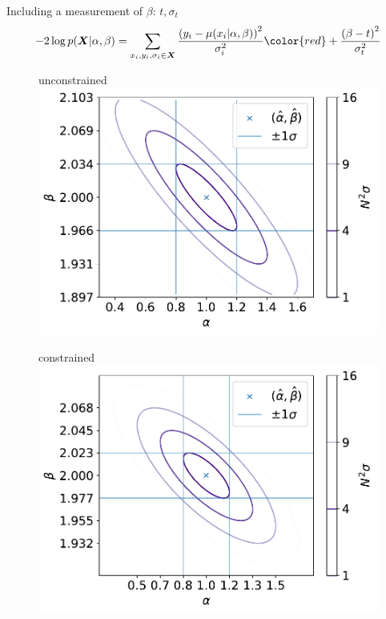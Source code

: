 \documentclass[
aspectratio=169,
14pt,
professionalfonts
]{beamer}
\begin{document}
\begin{frame}{Including a measurement of $\beta$: $t, \sigma_{t}$}
\vspace{-1cm}
    $$ -2\log p(\boldsymbol{X}|\alpha, \beta) = \sum_{x_i, y_i,\sigma_i \in \boldsymbol{X}}\frac{\left(y_i -\mu(x_i|\alpha, \beta)\right)^2}{\sigma_i^2} \color{red} + \frac{\left(\beta -t\right)^2}{\sigma_{t}^2} $$
    \begin{minipage}{0.49\textwidth}
        \begin{figure}
            \centering
            unconstrained
            \includegraphics[width=0.9\linewidth]{../plots/nll_unconstr.pdf}
        \end{figure}
    \end{minipage}
    \begin{minipage}{0.49\textwidth}
        \begin{figure}
            \centering
            constrained
            \includegraphics[width=0.9\linewidth]{../plots/nll_constr.pdf}
        \end{figure}
    \end{minipage}

\end{frame}
\end{document}
